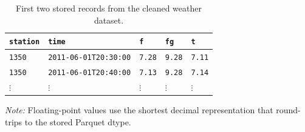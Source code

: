 \begin{table}[H]
\centering
\captionsetup{width=\linewidth}
\caption[First two stored records from the cleaned weather dataset.]{First two stored records from the cleaned weather dataset.}
\label{tab:exact-weather}
\fontsize{11}{14}\selectfont\setlength{\tabcolsep}{4pt}\renewcommand{\arraystretch}{1.2}
\begin{tabular}{lllll}
\toprule
\texttt{station} & \texttt{time} & \texttt{f} & \texttt{fg} & \texttt{t} \\
\midrule
\texttt{1350} & \texttt{2011-06-01T20:30:00} & \texttt{7.28} & \texttt{9.28} & \texttt{7.11} \\
\texttt{1350} & \texttt{2011-06-01T20:40:00} & \texttt{7.13} & \texttt{9.28} & \texttt{7.14} \\
$\vdots$ & $\vdots$ & $\vdots$ & $\vdots$ & $\vdots$ \\
\bottomrule
\end{tabular}
\par\smallskip\begin{minipage}{\linewidth}\small
\textit{Note:} Floating-point values use the shortest decimal representation that round-trips to the stored Parquet dtype.
\end{minipage}
\end{table}